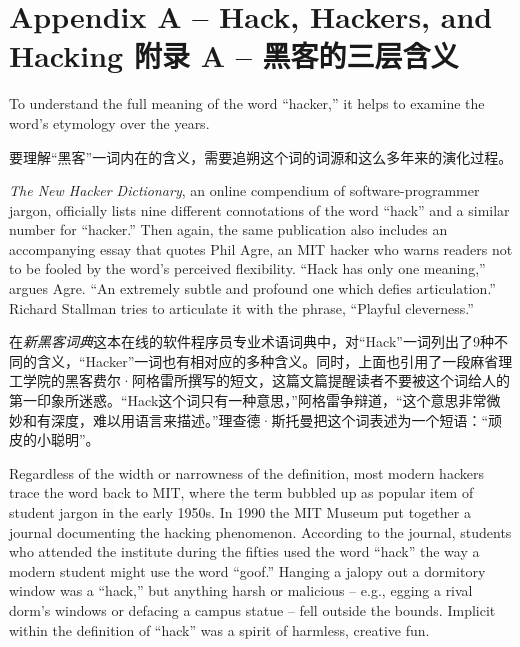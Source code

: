 
\chapter{\ifdefined\eng
Appendix A -- Hack, Hackers, and Hacking
\fi
\ifdefined\chs
附录 A -- 黑客的三层含义
\fi} \label{Appendix A}

\ifdefined\eng
To understand the full meaning of the word ``hacker,'' it helps to examine the word's etymology over the years.
\fi

\ifdefined\chs
要理解“黑客”一词内在的含义，需要追朔这个词的词源和这么多年来的演化过程。
\fi

\ifdefined\eng
\textit{The New Hacker Dictionary}, an online compendium of software-programmer jargon, officially lists nine different connotations of the word ``hack'' and a similar number for ``hacker.'' Then again, the same publication also includes an accompanying essay that quotes Phil Agre, an MIT hacker who warns readers not to be fooled by the word's perceived flexibility. ``Hack has only one meaning,'' argues Agre. ``An extremely subtle and profound one which defies articulation.''  Richard Stallman tries to articulate it with the phrase, ``Playful cleverness.''
\fi

\ifdefined\chs
在\textit{新黑客词典}这本在线的软件程序员专业术语词典中，对“Hack”一词列出了9种不同的含义，“Hacker”一词也有相对应的多种含义。同时，上面也引用了一段麻省理工学院的黑客费尔·阿格雷所撰写的短文，这篇文篇提醒读者不要被这个词给人的第一印象所迷惑。“Hack这个词只有一种意思，”阿格雷争辩道，“这个意思非常微妙和有深度，难以用语言来描述。”理查德·斯托曼把这个词表述为一个短语：“顽皮的小聪明”。
\fi

\ifdefined\eng
Regardless of the width or narrowness of the definition, most modern hackers trace the word back to MIT, where the term bubbled up as popular item of student jargon in the early 1950s. In 1990 the MIT Museum put together a journal documenting the hacking phenomenon. According to the journal, students who attended the institute during the fifties used the word ``hack'' the way a modern student might use the word ``goof.'' Hanging a jalopy out a dormitory window was a ``hack,'' but anything harsh or malicious -- e.g., egging a rival dorm's windows or defacing a campus statue -- fell outside the bounds. Implicit within the definition of ``hack'' was a spirit of harmless, creative fun.
\fi

